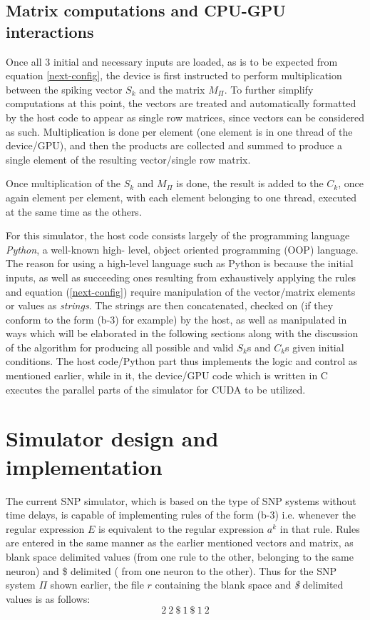 \documentclass{svmultm}
\begin{document}
\subsection{Matrix computations and CPU-{GPU} interactions}

Once all 3 initial and necessary inputs are loaded, as is to be
expected from equation \ref{next-config}, the device is first instructed to
perform multiplication between the spiking vector $S_k$ and the
matrix $M_{\Pi}$. To further simplify computations at this point, the
vectors are treated and automatically formatted by the host
code to appear as single row matrices, since vectors can be
considered as such. Multiplication is done per element (one
element is in one thread of the device/GPU{}), and then the
products are collected and summed to produce a single
element of the resulting vector/single row matrix.

Once multiplication of the $S_k$ and $M_{\Pi}$ is done,
the result is added to the $C_k$, once
again element per element, with each element belonging to
one thread, executed at the same time as the others.

For this simulator, the host code consists largely of
the programming language \textit{Python}, a well-known high-
level, object oriented programming (OOP) language. The
reason for using a high-level language such as Python is
because the initial inputs, as well as succeeding ones
resulting from exhaustively applying the rules and equation
(\ref{next-config}) require manipulation of the vector/matrix elements or
values as \textit{strings}. The strings are then concatenated, checked on (if they
conform to the form (b-3) for example) by the host, as well
as manipulated in ways which will be elaborated in the
following sections along with the discussion of the
algorithm for producing all possible and valid $S_k$s and $C_k$s given initial conditions. The host code/Python part thus implements the logic and control as mentioned earlier, while in it, the device/GPU code which is written in C executes the parallel parts of the simulator for CUDA to be utilized.


\section{Simulator design and implementation}\label{sect-snp-algo}

The current SNP simulator, which is based on the type of
SNP systems without time delays, is capable of
implementing rules of the form (b-3) i.e. whenever the
regular expression $E$ is equivalent to the regular expression $a^k$ in that rule. Rules are entered in the same manner
as the earlier mentioned vectors and matrix, as blank space
delimited values (from one rule to the other, belonging to the same neuron) and \$ delimited ( from one neuron to the
other). Thus for the SNP system ${\Pi}$ shown earlier, the file $r$
containing the blank space and \textit{\$} delimited values is as
follows:
\begin{equation}\label{rules}
2~2~\$~1~\$~1~2
\end{equation}
\end{document}
